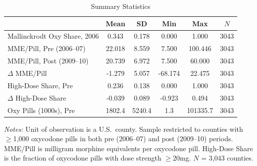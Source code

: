 \begin{table}[htbp]
\centering
\caption{Summary Statistics}
\label{tab:sumstats}
\begin{tabular}{lccccc}
\hline\hline
 & Mean & SD & Min & Max & $N$ \\
\hline
Mallinckrodt Oxy Share, 2006 & 0.343 & 0.178 & 0.000 & 1.000 & 3043 \\
MME/Pill, Pre (2006--07) & 22.018 & 8.559 & 7.500 & 100.446 & 3043 \\
MME/Pill, Post (2009--10) & 20.739 & 6.972 & 7.500 & 60.000 & 3043 \\
$\Delta$ MME/Pill & -1.279 & 5.057 & -68.174 & 22.475 & 3043 \\
High-Dose Share, Pre & 0.236 & 0.138 & 0.000 & 1.000 & 3043 \\
$\Delta$ High-Dose Share & -0.039 & 0.089 & -0.923 & 0.494 & 3043 \\
Oxy Pills (1000s), Pre & 1802.4 & 5240.4 & 1.3 & 101335.7 & 3043 \\
\hline\hline
\end{tabular}
\par\vspace{0.5em}\parbox{\textwidth}{\small \textit{Notes:} Unit of observation is a U.S.\ county. Sample restricted to counties with $\geq$1,000 oxycodone pills in both pre (2006--07) and post (2009--10) periods. MME/Pill is milligram morphine equivalents per oxycodone pill. High-Dose Share is the fraction of oxycodone pills with dose strength $\geq$20mg. $N$ = 3,043 counties.
}
\end{table}
